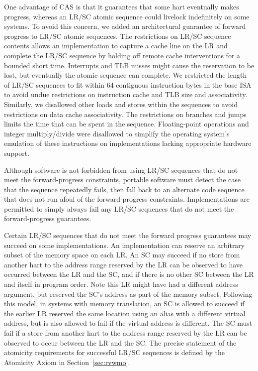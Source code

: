 \begin{commentary}
One advantage of CAS is that it guarantees that some hart eventually
makes progress, whereas an LR/SC atomic sequence could livelock
indefinitely on some systems.  To avoid this concern, we added an
architectural guarantee of forward progress to LR/SC atomic sequences.
The restrictions on LR/SC sequence contents allows an implementation
to capture a cache line on the LR and complete the LR/SC sequence by
holding off remote cache interventions for a bounded short
time. Interrupts and TLB misses might cause the reservation to be
lost, but eventually the atomic sequence can complete.  We restricted
the length of LR/SC sequences to fit within 64 contiguous instruction
bytes in the base ISA to avoid undue restrictions on instruction cache
and TLB size and associativity.  Similarly, we disallowed other loads
and stores within the sequences to avoid restrictions on data cache
associativity.  The restrictions on branches and jumps limits the time
that can be spent in the sequence.  Floating-point operations and
integer multiply/divide were disallowed to simplify the operating
system's emulation of these instructions on implementations lacking
appropriate hardware support.

Although software is not forbidden from using LR/SC sequences that do not meet
the forward-progress constraints, portable software must detect the case that
the sequence repeatedly fails, then fall back to an alternate code sequence
that does not run afoul of the forward-progress constraints.
Implementations are permitted to simply always fail any LR/SC sequences that do
not meet the forward-progress guarantees.
\end{commentary}

Certain LR/SC sequences that do not meet the forward progress
guarantees may succeed on some implementations.  An implementation can
reserve an arbitrary subset of the memory space on each LR.  An SC may
succeed if no store from another hart to the address range reserved by
the LR can be observed to have occurred between the LR and the SC, and
if there is no other SC between the LR and itself in program order.
Note this LR might have had a different address argument, but reserved
the SC's address as part of the memory subset.  Following this model,
in systems with memory translation, an SC is allowed to succeed if the
earlier LR reserved the same location using an alias with a different
virtual address, but is also allowed to fail if the virtual address is
different.  The SC must fail if a store from another hart to the
address range reserved by the LR can be observed to occur between the
LR and the SC.  The precise statement of the atomicity requirements for
successful LR/SC sequences is defined by the Atomicity Axiom in
Section~\ref{sec:rvwmo}.

